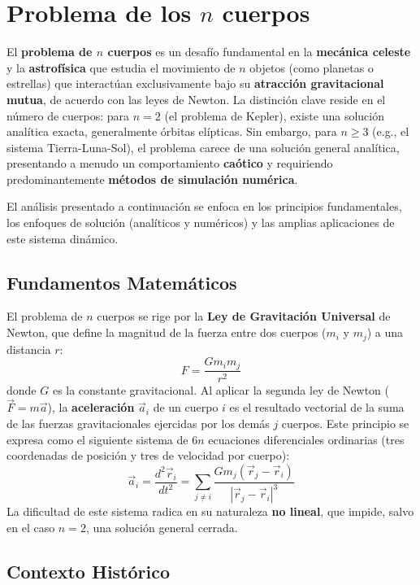 
\section{Problema de los $n$ cuerpos}
\label{sec:n-body_problem}

El \textbf{problema de $n$ cuerpos} es un desafío fundamental en la \textbf{mecánica celeste} y la \textbf{astrofísica} que estudia el movimiento de $n$ objetos (como planetas o estrellas) que interactúan exclusivamente bajo su \textbf{atracción gravitacional mutua}, de acuerdo con las leyes de Newton. La distinción clave reside en el número de cuerpos: para $n=2$ (el problema de Kepler), existe una solución analítica exacta, generalmente órbitas elípticas. Sin embargo, para $n \geq 3$ (e.g., el sistema Tierra-Luna-Sol), el problema carece de una solución general analítica, presentando a menudo un comportamiento \textbf{caótico} y requiriendo predominantemente \textbf{métodos de simulación numérica}.

El análisis presentado a continuación se enfoca en los principios fundamentales, los enfoques de solución (analíticos y numéricos) y las amplias aplicaciones de este sistema dinámico.

\subsection{Fundamentos Matemáticos}
\label{subsec:fundamentos}

El problema de $n$ cuerpos se rige por la \textbf{Ley de Gravitación Universal} de Newton, que define la magnitud de la fuerza entre dos cuerpos ($m_i$ y $m_j$) a una distancia $r$:
$$
F = \frac{G m_i m_j}{r^2}
$$
donde $G$ es la constante gravitacional. Al aplicar la segunda ley de Newton ($\vec{F} = m \vec{a}$), la \textbf{aceleración} $\vec{a}_i$ de un cuerpo $i$ es el resultado vectorial de la suma de las fuerzas gravitacionales ejercidas por los demás $j$ cuerpos. Este principio se expresa como el siguiente sistema de $6n$ ecuaciones diferenciales ordinarias (tres coordenadas de posición y tres de velocidad por cuerpo):
\begin{equation}
    \vec{a}_i = \frac{d^2 \vec{r}_i}{dt^2} = \sum_{j \neq i} \frac{G m_j (\vec{r}_j - \vec{r}_i)}{|\vec{r}_j - \vec{r}_i|^3}
\end{equation}
La dificultad de este sistema radica en su naturaleza \textbf{no lineal}, que impide, salvo en el caso $n=2$, una solución general cerrada.

\subsection{Contexto Histórico}
\label{subsec:contexto_historico}

